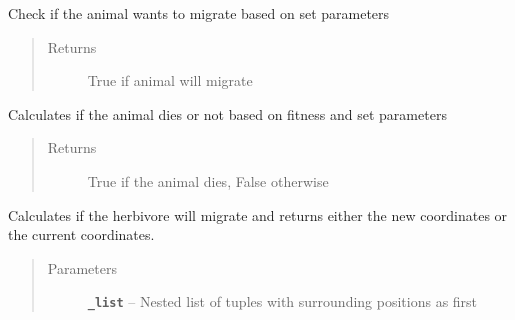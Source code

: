 \documentclass[a4paper,10pt,openany,oneside]{sphinxmanual}
\begin{document}
\begin{fulllineitems}
\begin{fulllineitems}
\end{fulllineitems}


\begin{fulllineitems}
\label{animals:biosim.animals.Animal.check_migrate}
Check if the animal wants to migrate based on set parameters
\begin{quote}\begin{description}
\item[{Returns}] \leavevmode
True if animal will migrate

\end{description}\end{quote}

\end{fulllineitems}


\begin{fulllineitems}
\label{animals:biosim.animals.Animal.death}
Calculates if the animal dies or not based on fitness and set parameters
\begin{quote}\begin{description}
\item[{Returns}] \leavevmode
True if the animal dies, False otherwise

\end{description}\end{quote}

\end{fulllineitems}


\begin{fulllineitems}
\label{animals:biosim.animals.Animal.migrate}
Calculates if the herbivore will migrate and returns either the new
coordinates or the current coordinates.
\begin{quote}\begin{description}
\item[{Parameters}] \leavevmode
\textbf{\texttt{\_list}} -- Nested list of tuples with surrounding positions as first

\end{description}\end{quote}


\end{fulllineitems}
\end{fulllineitems}
\end{document}
